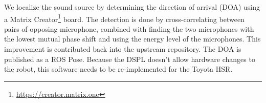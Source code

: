 We localize the sound source by determining the direction of arrival (DOA) using a Matrix Creator\footnote{\url{https://creator.matrix.one}} board. 
The detection is done by cross-correlating between pairs of opposing microphone, combined with finding the two microphones with the lowest mutual phase shift and using the energy level of the microphones.
This improvement is contributed back into the upstream repository. 
The DOA is published as a ROS Pose. 
Because the DSPL doesn't allow hardware changes to the robot, this software needs to be re-implemented for the Toyota HSR.

